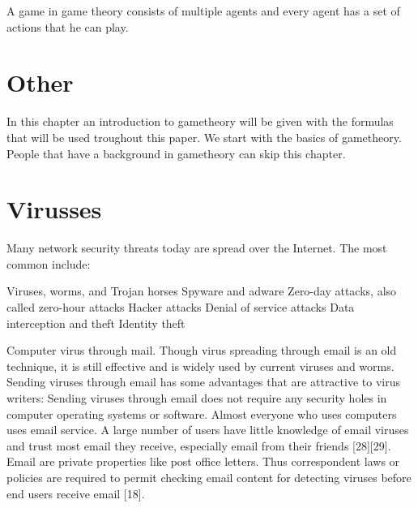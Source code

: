 A game in game theory consists of multiple agents and every agent has a set of actions that he can play. 








\section{Other}
In this chapter an introduction to gametheory will be given with the formulas that will be used troughout this paper. We start with the basics of gametheory. People that have a background in gametheory can skip this chapter.

\section{Virusses}

Many network security threats today are spread over the Internet. The most common include:

Viruses, worms, and Trojan horses
Spyware and adware
Zero-day attacks, also called zero-hour attacks
Hacker attacks
Denial of service attacks
Data interception and theft
Identity theft


Computer virus through mail. 
Though virus spreading through email is an old technique, it is still effective and is widely used by
current viruses and worms. Sending viruses through email has some advantages that are attractive to
virus writers:
 Sending viruses through email does not require any security holes in computer operating systems
or software.
 Almost everyone who uses computers uses email service.
 A large number of users have little knowledge of email viruses and trust most email they receive,
especially email from their friends [28][29].
 Email are private properties like post office letters. Thus correspondent laws or policies are required
to permit checking email content for detecting viruses before end users receive email [18].

